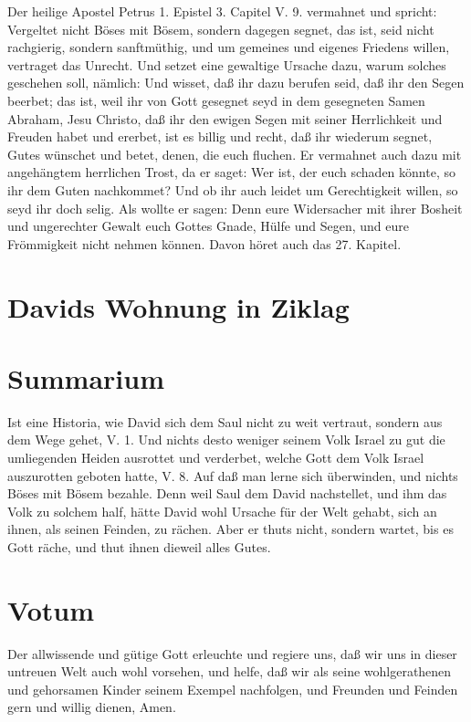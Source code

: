 Der heilige Apostel Petrus 1. Epistel 3. Capitel V. 9. vermahnet und spricht: Vergeltet nicht Böses mit Bösem, sondern dagegen segnet, das ist, seid nicht rachgierig, sondern sanftmüthig, und um gemeines und eigenes Friedens willen, vertraget das Unrecht. Und setzet eine gewaltige Ursache dazu, warum solches geschehen soll, nämlich: Und wisset, daß ihr dazu berufen seid, daß ihr den Segen beerbet; das ist, weil ihr von Gott gesegnet seyd in dem gesegneten Samen Abraham, Jesu Christo, daß ihr den ewigen Segen mit seiner Herrlichkeit und Freuden habet und ererbet, ist es billig und recht, daß ihr wiederum segnet, Gutes wünschet und betet, denen, die euch fluchen. Er vermahnet auch dazu mit angehängtem herrlichen Trost, da er saget: Wer ist, der euch schaden könnte, so ihr dem Guten nachkommet? Und ob ihr auch leidet um Gerechtigkeit willen, so seyd ihr doch selig. Als wollte er sagen: Denn eure Widersacher mit ihrer Bosheit und ungerechter Gewalt euch Gottes Gnade, Hülfe und Segen, und eure Frömmigkeit nicht nehmen können. Davon höret auch das 27. Kapitel.

\section{Davids Wohnung in Ziklag}

\section{Summarium}

Ist eine Historia, wie David sich dem Saul nicht zu weit vertraut, sondern aus dem Wege gehet, V. 1. Und nichts desto weniger seinem Volk Israel zu gut die umliegenden Heiden ausrottet und verderbet, welche Gott dem Volk Israel auszurotten geboten hatte, V. 8. Auf daß man lerne sich überwinden, und nichts Böses mit Bösem bezahle. Denn weil Saul dem David nachstellet, und ihm das Volk zu solchem half, hätte David wohl Ursache für der Welt gehabt, sich an ihnen, als seinen Feinden, zu rächen. Aber er thuts nicht, sondern wartet, bis es Gott räche, und thut ihnen dieweil alles Gutes.

\section{Votum}

Der allwissende und gütige Gott erleuchte und regiere uns, daß wir uns in dieser untreuen Welt auch wohl vorsehen, und helfe, daß wir als seine wohlgerathenen und gehorsamen Kinder seinem Exempel nachfolgen, und Freunden und Feinden gern und willig dienen, Amen.

